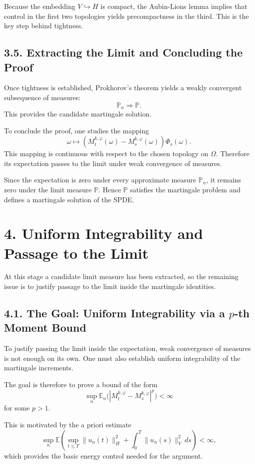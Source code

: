 \documentclass[11pt]{article}
\theoremstyle{definition}
\theoremstyle{remark}
\begin{document}
Because the embedding \(V\hookrightarrow H\) is compact, the Aubin-Lions lemma implies that control in the first two topologies yields precompactness in the third. This is the key step behind tightness.

\subsection*{3.5. Extracting the Limit and Concluding the Proof}
Once tightness is established, Prokhorov's theorem yields a weakly convergent subsequence of measures:
\[
\mathbb P_n \Rightarrow \mathbb P.
\]
This provides the candidate martingale solution.

To conclude the proof, one studies the mapping
\[
\omega\mapsto (M_t^{k,\varphi}(\omega)-M_s^{k,\varphi}(\omega))\Phi_s(\omega).
\]
This mapping is continuous with respect to the chosen topology on \(\Omega\). Therefore its expectation passes to the limit under weak convergence of measures.

Since the expectation is zero under every approximate measure \(\mathbb P_n\), it remains zero under the limit measure \(\mathbb P\). Hence \(\mathbb P\) satisfies the martingale problem and defines a martingale solution of the SPDE.

\section*{4. Uniform Integrability and Passage to the Limit}
At this stage a candidate limit measure has been extracted, so the remaining issue is to justify passage to the limit inside the martingale identities.

\subsection*{4.1. The Goal: Uniform Integrability via a \(p\)-th Moment Bound}
To justify passing the limit inside the expectation, weak convergence of measures is not enough on its own. One must also establish uniform integrability of the martingale increments.

The goal is therefore to prove a bound of the form
\[
\sup_n \mathbb E_n\bigl(|M_t^{k,\varphi}-M_s^{k,\varphi}|^p\bigr)<\infty
\]
for some \(p>1\).

This is motivated by the a priori estimate
\[
\sup_n
\mathbb E\left(
\sup_{t\le T}\|u_n(t)\|_H^2
+
\int_0^T \|u_n(s)\|_V^2\,ds
\right)
<\infty,
\]
which provides the basic energy control needed for the argument.
\end{document}
